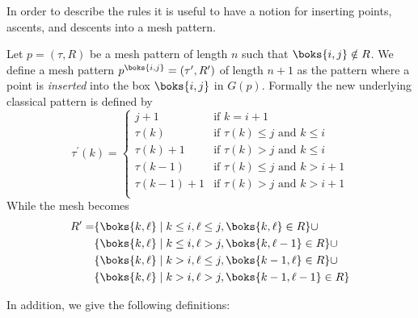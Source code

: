 In order to describe the rules it is useful to have a notion for inserting points, ascents, and
descents into a mesh pattern.
\begin{definition}
\label{def:ap}
Let \(p=(\tau,R)\) be a mesh pattern of length \(n\) such that \(\boks{i,j}\notin R\). We define
a mesh pattern \(p^\boks{i,j} = (\tau^\prime,R^\prime)\) of length \(n+1\) as the pattern where a
point is \emph{inserted} into the box \(\boks{i,j}\) in \(G(p)\). Formally the new underlying
classical pattern is defined by
\begin{equation*}
\tau^\prime(k) = \begin{cases}
    j+1 & \text{if } k = i+1\\
    \tau(k) & \text{if } \tau(k)\le j \text{ and }k\le i\\
    \tau(k)+1 & \text{if } \tau(k)> j \text{ and }k\le i\\
    \tau(k-1) & \text{if } \tau(k)\le j \text{ and }k> i+1\\
    \tau(k-1)+1 & \text{if } \tau(k)> j \text{ and }k> i+1\\
\end{cases}
\end{equation*}
While the mesh becomes
\begin{equation*}
\begin{aligned}
R^\prime=&\{\boks{k,\ell}\mid k\le i, \ell\le j, \boks{k,\ell}\in R\} \cup\\
&\{\boks{k,\ell}\mid k\le i, \ell > j, \boks{k,\ell-1}\in R\}\cup\\
&\{\boks{k,\ell}\mid k > i, \ell \le j, \boks{k-1,\ell}\in R\}\cup\\
&\{\boks{k,\ell}\mid k > i, \ell > j, \boks{k-1,\ell-1}\in R\}\\
\end{aligned}
\end{equation*}
\end{definition}
In addition, we give the following definitions:

